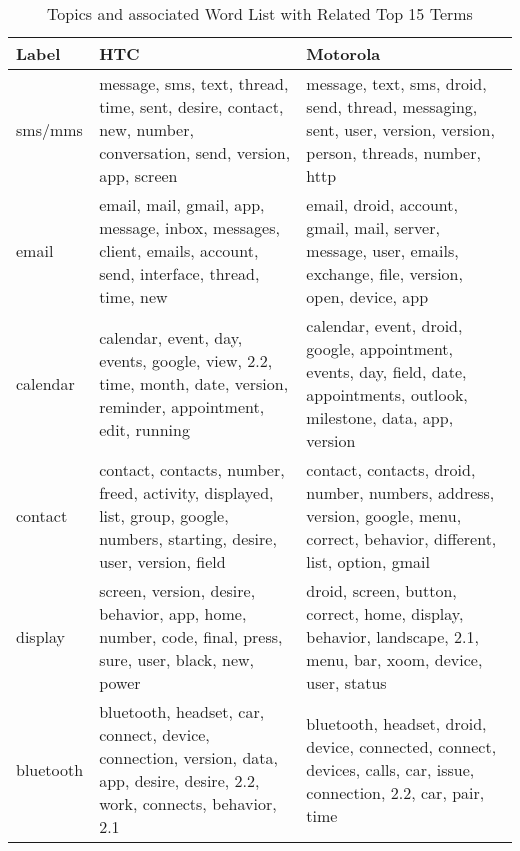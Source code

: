 \begin{table*}[!htb]
\caption{Topics and associated Word List with Related Top 15 Terms}
\label{topicslist}
\centering
\begin{tabular}{|m{1.75cm}<{\centering}||m{7.33cm}<{\centering}||m{7.33cm}<{\centering}|}
\hline
Label & HTC & Motorola\\ 
\hline
 sms\//mms &
message,  sms,  text,  thread,  time,  
sent,  desire,  contact,  new,  number,  
conversation,  send,  version,  app,  screen 
&
message,  text,  sms,  droid,  send, 
thread,  messaging,  sent,  user,  version, 
version,  person,  threads,  number,  http
\\ \hline

email &
email,  mail,  gmail,  app,  message,  
inbox,  messages,  client,  emails,  account,  
send,  interface,  thread,  time,  new 
&
email,  droid,  account,  gmail,  mail, 
server,  message,  user,  emails,  exchange, 
file,  version,  open,  device,  app
\\ \hline

calendar 
&
calendar,  event,  day,  events,  google,  
view,  2.2,  time,  month,  date,  
version,  reminder,  appointment,  edit,  running 
&
calendar,  event,  droid,  google,  appointment, 
events,  day,  field,  date,  appointments, 
 outlook,  milestone,  data,  app,  version
\\ \hline

contact
&
contact,  contacts,  number,  freed,  activity,  
displayed,  list,  group,  google,  numbers,  
starting,  desire,  user,  version,  field 
&
contact,  contacts,  droid,  number,  numbers, 
address,  version,  google,  menu,  correct, 
behavior,  different, list,  option,  gmail
\\ \hline

display
&
screen,  version,  desire,  behavior,  app,  
home,  number,  code,  final,  press,  
  sure,  user,  black,  new,  power 
&
droid,  screen,  button,  correct,  home, 
display,  behavior,  landscape,  2.1,  menu, 
bar,  xoom, device,  user,  status
\\ \hline


bluetooth
&
bluetooth, headset,  car,  connect,  device,  
connection,  version,  data,  app,  desire,  
desire,  2.2,  work,  connects,  behavior,  2.1 
&
bluetooth,  headset,  droid,  device, connected, 
connect,  devices,  calls,  car, issue, 
connection,  2.2,  car,  pair,  time
\\ \hline


\end{tabular}
\end{table*}
